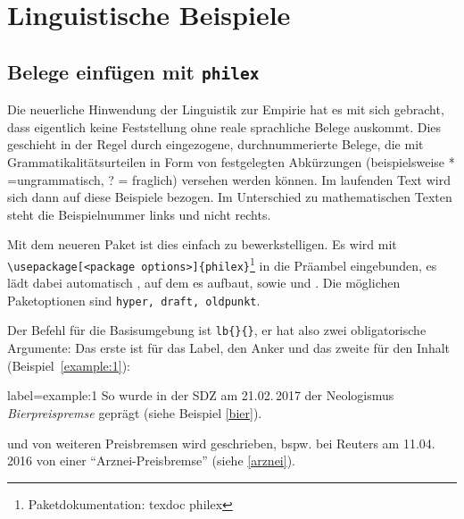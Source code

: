 
%

%

\section{Linguistische Beispiele}

\subsection{Belege einfügen mit \texttt{philex}}
\label{belege} 
\author{Christine Römer}

Die neuerliche Hinwendung der Linguistik zur Empirie hat es mit sich gebracht, dass eigentlich keine Feststellung ohne reale sprachliche Belege
auskommt. Dies geschieht in der Regel durch eingezogene, durchnummerierte Belege, die mit Grammatikalitätsurteilen in Form von festgelegten Abkürzungen (beispielsweise * =ungrammatisch, ? = fraglich) versehen werden können.
Im laufenden Text wird sich dann auf diese Beispiele bezogen. Im Unterschied zu mathematischen Texten steht die Beispielnummer links und nicht rechts.

Mit dem neueren Paket  ist dies einfach zu bewerkstelligen.
Es wird mit \verb|\usepackage[<package options>]{philex}|\footnote{Paketdokumentation: texdoc philex} in die Präambel eingebunden, es lädt dabei automatisch , auf dem es aufbaut, sowie  und . Die möglichen Paketoptionen sind \texttt{hyper, draft, oldpunkt}.

Der Befehl für die Basisumgebung ist  \verb|lb{}{}|, er hat also
zwei obligatorische Argumente: Das erste ist für das Label, den Anker und das zweite für den Inhalt (Beispiel~\ref{example:1}):

\begin{lfgwexample}{label={example:1}}
So wurde in der SDZ am 21.02.\,2017 der Neologismus \emph{Bierpreispremse} geprägt (siehe Beispiel \ref{bier}).


und von weiteren Preisbremsen wird geschrieben, bspw. bei Reuters am 11.04.\,2016 von einer \enquote{Arznei-Preisbremse} (siehe \ref{arznei}).


\end{lfgwexample}

